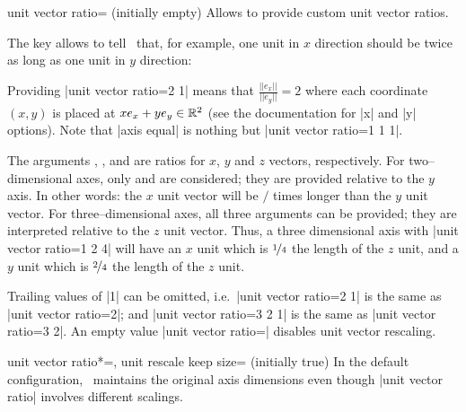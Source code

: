 \begin{pgfplotskey}{unit vector ratio= (initially empty)}
	Allows to provide custom unit vector ratios. 

	The key allows to tell \PGFPlots\ that, for example, one unit in $x$ direction should be twice as long as one unit in $y$ direction:
\begin{codeexample}[]
\end{codeexample}
	\noindent Providing |unit vector ratio=2 1| means that $\frac{||e_x||}{||e_y||} = 2$ where each coordinate $(x,y)$ is placed at $x e_x + y e_y \in \mathbb{R}^2$ (see the documentation for |x| and |y| options). Note that |axis equal| is nothing but |unit vector ratio=1 1 1|.

	The arguments , , and  are ratios for $x$, $y$ and $z$ vectors, respectively. For two--dimensional axes, only  and  are considered; they are provided relative to the $y$ axis. In other words: the $x$ unit vector will be  $/$  times longer than the $y$ unit vector. For three--dimensional axes, all three arguments can be provided; they are interpreted relative to the $z$ unit vector. Thus, a three dimensional axis with |unit vector ratio=1 2 4| will have an $x$ unit which is $\nicefrac 14$ the length of the $z$ unit, and a $y$ unit which is $\nicefrac24$ the length of the $z$ unit. 
	
	Trailing values of |1| can be omitted, i.e.\ |unit vector ratio=2 1| is the same as |unit vector ratio=2|; and |unit vector ratio=3 2 1| is the same as |unit vector ratio=3 2|.
	An empty value |unit vector ratio={}| disables unit vector rescaling.

	\begin{pgfplotskeylist}{%
		unit vector ratio*=,
		unit rescale keep size= (initially true)}
	In the default configuration, \PGFPlots\ maintains the original axis dimensions even though |unit vector ratio| involves different scalings. 


\end{pgfplotskeylist}
\end{pgfplotskey}
